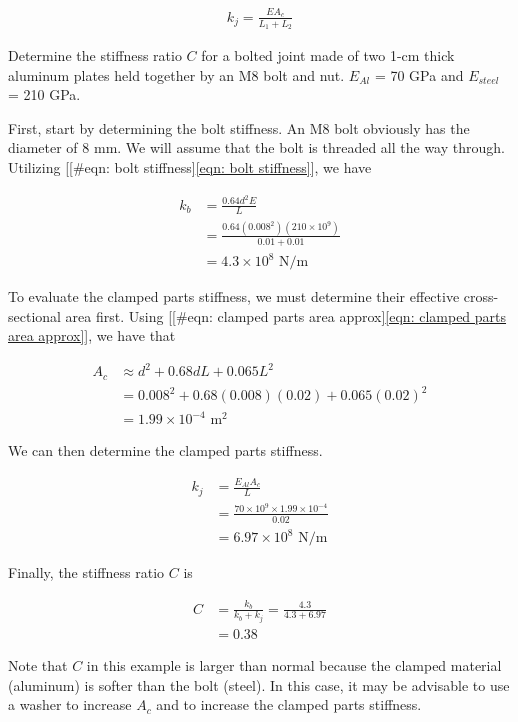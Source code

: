 \documentclass[a4paper,openany,12pt]{book}
\begin{document}
{{$$\begin{aligned}
  k_j = \frac{EA_c}{L_1+L_2}\end{aligned}$$

Determine the stiffness ratio \(C\) for a bolted joint made of two 1-cm
thick aluminum plates held together by an M8 bolt and nut. \(E_{Al}\) = 70
GPa and \(E_{steel}\) = 210 GPa.

First, start by determining the bolt stiffness. An M8 bolt obviously has
the diameter of 8 mm. We will assume that the bolt is threaded all the
way through. Utilizing [[\#eqn: bolt stiffness]\ref{eqn: bolt stiffness}],
we have

$$\begin{aligned}
    k_b &= \frac{0.64d^2E}{L} \\
        &= \frac{0.64 (0.008^2)(210 \times 10^9)}{0.01+0.01} \\
        &= 4.3 \times 10^8 \text{ N/m}
  \end{aligned}$$

To evaluate the clamped parts stiffness, we must determine their
effective cross-sectional area first. Using
[[\#eqn: clamped parts area approx]\ref{eqn: clamped parts area approx}],
we have that

$$\begin{aligned}
    A_c &\approx d^2 + 0.68dL + 0.065L^2 \\
        &= 0.008^2 + 0.68(0.008)(0.02) + 0.065(0.02)^2 \\
        &= 1.99 \times 10^{-4} \text{ m}^2
  \end{aligned}$$

We can then determine the clamped parts stiffness.

$$\begin{aligned}
    k_j &= \frac{E_{Al}A_c}{L} \\
        &= \frac{70 \times 10^9 \times 1.99 \times 10^{-4}}{0.02} \\
        &= 6.97 \times 10^8 \text{ N/m}
  \end{aligned}$$

Finally, the stiffness ratio \(C\) is

$$\begin{aligned}
    C & = \frac{k_b}{k_b + k_j} = \frac{4.3}{4.3 + 6.97} \\
      &= 0.38
  \end{aligned}$$

Note that \(C\) in this example is larger than normal because the clamped
material (aluminum) is softer than the bolt (steel). In this case, it
may be advisable to use a washer to increase \(A_c\) and to increase the
clamped parts stiffness.

}}
\end{document}
